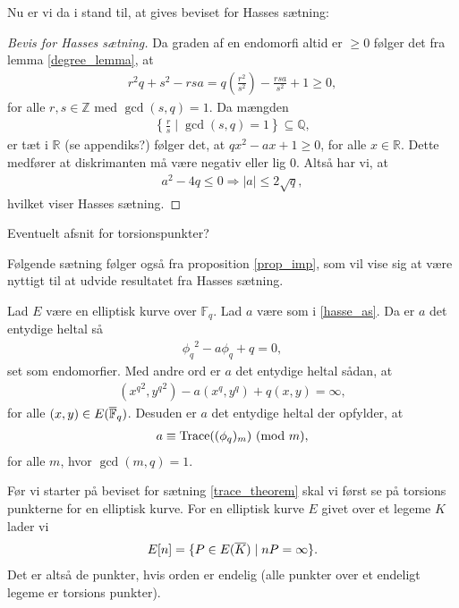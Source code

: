Nu er vi da i stand til, at gives beviset for Hasses sætning:

\begin{proof}[Bevis for Hasses sætning]
Da graden af en endomorfi altid er $\geq 0$ følger det fra lemma \ref{degree_lemma}, at 
\begin{align*}
	r^2q+s^2 -rsa = q \left( \frac{r^2}{s^2} \right) - \frac{rsa}{s^2} + 1 
	\geq 0,
\end{align*}
for alle $r, s \in \mathbb{Z}$ med $\gcd(s, q)=1$. Da mængden
\begin{align*}
	\left\{ \frac{r}{s} \mid \gcd(s, q)=1 \right\} \subseteq \mathbb{Q},
\end{align*}
er tæt i $\mathbb{R}$ (se appendiks?) følger det, at $qx^2 - ax + 1 \geq 0$,
for alle $x \in \mathbb{R}$. Dette medfører at diskrimanten må være negativ eller lig $0$.
Altså har vi, at 
\begin{align*}
	a^2 - 4q \leq 0 \Rightarrow |a| \leq 2 \sqrt{q},
\end{align*}
hvilket viser Hasses sætning.
\end{proof}

Eventuelt afsnit for torsionspunkter?

Følgende sætning følger også fra proposition \ref{prop_imp}, som vil vise sig at være nyttigt til at udvide resultatet fra Hasses sætning.

\begin{theorem}
\label{trace_theorem}
Lad $E$ være en elliptisk kurve over $\mathbb{F}_q$. Lad $a$ være som i \eqref{hasse_as}. Da er $a$ det
entydige heltal så
\begin{align*}
	{\phi_q}^2 - a \phi_q + q = 0,
\end{align*}
set som endomorfier. Med andre ord er $a$ det entydige heltal sådan, at 
\begin{align*}
	({x^q}^2, {y^q}^2) - a(x^q, y^q) + q(x, y) = \infty,
\end{align*}
for alle $(x, y) \in E(\overline{\mathbb{F}}_q)$. Desuden er $a$ det entydige heltal der opfylder, at
\begin{align*}
	a \equiv \text{Trace}((\phi_q)_m) \ (\mathrm{mod} \ m),
\end{align*}
for alle $m$, hvor $\gcd(m, q)=1$.
\end{theorem}

Før vi starter på beviset for sætning \ref{trace_theorem} skal vi først se på torsions punkterne for en elliptisk kurve. For en elliptisk kurve $E$ givet over et legeme $K$ lader vi
\begin{align*}
	E[n] = \{ P \in E(\overline{K}) \mid nP= \infty \}.
\end{align*}
Det er altså de punkter, hvis orden er endelig (alle punkter over et endeligt legeme er torsions punkter). 

